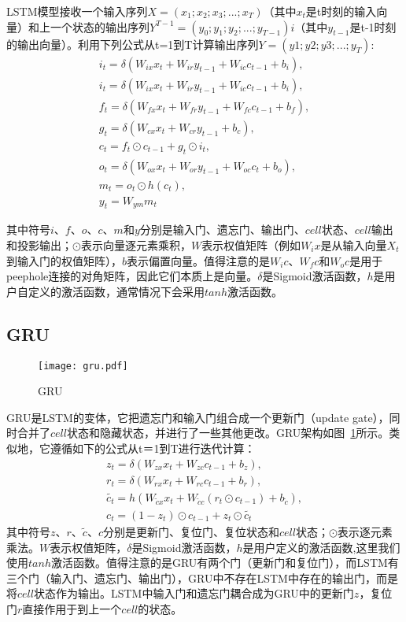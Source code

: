 LSTM模型接收一个输入序列$X=(x_1;x_2;x_3;...;x_T)$（其中$x_t$是t时刻的输入向量）和上一个状态的输出序列$Y^{T-1}=(y_0;y_1;y_2;...;y_{T-1})i$（其中$y_{t-1}$是t-1时刻的输出向量）。利用下列公式从t=1到T计算输出序列$Y=(y1;y2;y3;...;y_T)$:
\begin{gather}
i_t=\delta (W_{ix}x_t + W_{ir}y_{t-1} + W_{ic}c_{t-1} + b_i), \\
i_t=\delta (W_{ix}x_t + W_{ir}y_{t-1} + W_{ic}c_{t-1} + b_i), \\
f_t=\delta (W_{fx}x_t + W_{fr}y_{t-1} + W_{fc}c_{t-1} + b_f), \\
g_t=\delta (W_{cx}x_t + W_{cr}y_{t-1} + b_c), \\
c_t=f_t \odot c_{t-1} + g_t \odot i_t, \\
o_t=\delta (W_{ox}x_t + W_{or}y_{t-1} + W_{oc}c_{t} + b_o), \\
m_t=o_t \odot h(c_t), \\
y_t=W_{ym}m_t 
\end{gather}

其中符号$i$、$f$、$o$、$c$、$m$和$y$分别是输入门、遗忘门、输出门、$cell$状态、$cell$输出和投影输出；$\odot$表示向量逐元素乘积，$W$表示权值矩阵（例如$W_ix$是从输入向量$X_t$到输入门的权值矩阵），$b$表示偏置向量。值得注意的是$W_ic$、$W_fc$和$W_oc$是用于peephole连接的对角矩阵，因此它们本质上是向量。$\delta$是Sigmoid激活函数，$h$是用户自定义的激活函数，通常情况下会采用$tanh$激活函数。

\subsection{GRU}
\begin{figure}[h]
\centering
\texttt{[image: gru.pdf]}
\caption{\footnotesize GRU}
\label{fig:gru}
\end{figure}
GRU是LSTM的变体，它把遗忘门和输入门组合成一个更新门（update gate），同时合并了$cell$状态和隐藏状态，并进行了一些其他更改。GRU架构如图~\ref{fig:gru}所示。类似地，它遵循如下的公式从t＝1到T进行迭代计算：
\begin{gather}
z_t=\delta(W_{zx}x_t+W_{zc}c_{t-1}+b_z),\\
r_t=\delta(W_{rx}x_t+W_{rc}c_{t-1}+b_r),\\
\tilde{c_t}=h(W_{\tilde{c}x}x_t+W_{\tilde{c}c}(r_t \odot c_{t-1}) + b_{\tilde{c}}),\\
c_t=(1-z_t) \odot c_{t-1} + z_t \odot \tilde{c_t}
\end{gather}
其中符号$z$、$r$、$\tilde{c}$、$c$分别是更新门、复位门、复位状态和$cell$状态；$\odot$表示逐元素乘法。$W$表示权值矩阵，$\delta$是Sigmoid激活函数，$h$是用户定义的激活函数,这里我们使用$tanh$激活函数。值得注意的是GRU有两个门（更新门和复位门），而LSTM有三个门（输入门、遗忘门、输出门），GRU中不存在LSTM中存在的输出门，而是将$cell$状态作为输出。LSTM中输入门和遗忘门耦合成为GRU中的更新门$z$，复位门$r$直接作用于到上一个$cell$的状态。 


